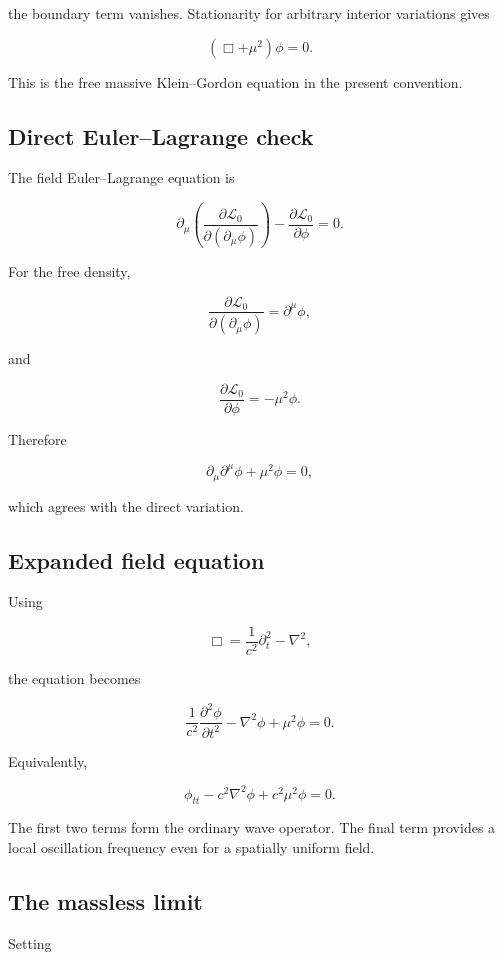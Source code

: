 the boundary term vanishes. Stationarity for arbitrary interior variations gives

\[
\boxed{
\left(
\Box+\mu^{2}
\right)
\phi=0
}.
\]

This is the free massive Klein--Gordon equation in the present convention.

\subsection{Direct Euler--Lagrange check}

The field Euler--Lagrange equation is

\[
\partial_{\mu}
\left(
\frac{\partial\mathcal{L}_{0}}
{\partial(\partial_{\mu}\phi)}
\right)
-
\frac{\partial\mathcal{L}_{0}}{\partial\phi}
=0.
\]

For the free density,

\[
\frac{\partial\mathcal{L}_{0}}
{\partial(\partial_{\mu}\phi)}
=
\partial^{\mu}\phi,
\]

and

\[
\frac{\partial\mathcal{L}_{0}}{\partial\phi}
=
-\mu^{2}\phi.
\]

Therefore

\[
\partial_{\mu}\partial^{\mu}\phi
+
\mu^{2}\phi
=0,
\]

which agrees with the direct variation.

\subsection{Expanded field equation}

Using

\[
\Box
=
\frac{1}{c^{2}}\partial_{t}^{2}
-
\nabla^{2},
\]

the equation becomes

\[
\boxed{
\frac{1}{c^{2}}
\frac{\partial^{2}\phi}{\partial t^{2}}
-
\nabla^{2}\phi
+
\mu^{2}\phi
=0
}.
\]

Equivalently,

\[
\boxed{
\phi_{tt}
-
c^{2}\nabla^{2}\phi
+
c^{2}\mu^{2}\phi
=0
}.
\]

The first two terms form the ordinary wave operator. The final term provides a local oscillation frequency even for a spatially uniform field.

\subsection{The massless limit}

Setting

